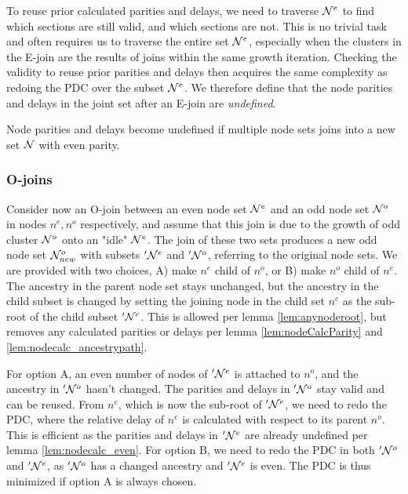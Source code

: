 To reuse prior calculated parities and delays, we need to traverse $\mathcal{N}^e$ to find which sections are still valid, and which sections are not. This is no trivial task and often requires us to traverse the entire set $\mathcal{N}^e$, especially when the clusters in the E-join are the results of joins within the same growth iteration.  Checking the validity to reuse prior parities and delays then acquires the same complexity as redoing the PDC over the subset $\mathcal{N}^e$. We therefore define that the node parities and delays in the joint set after an E-join are \emph{undefined}.

\begin{lemma}\label{lem:nodecalc_even}
  Node parities and delays become undefined if multiple node sets joins into a new set $\mathcal{N}$ with even parity.
\end{lemma}

\subsubsection{O-joins}

Consider now an O-join between an even node set $\mathcal{N}^e$ and an odd node set $\mathcal{N}^o$ in nodes $n^e, n^o$ respectively, and assume that this join is due to the growth of odd cluster $\mathcal{N}^o$ onto an "idle" $\mathcal{N}^e$. The join of these two sets produces a new odd node set $\mathcal{N}_{new}^o$ with subsets $'\mathcal{N}^e$ and $'\mathcal{N}^o$, referring to the original node sets. We are provided with two choices, A) make $n^e$ child of $n^o$, or B) make $n^o$ child of $n^e$. The ancestry in the parent node set stays unchanged, but the ancestry in the child subset is changed by setting the joining node in the child set $n^c$ as the sub-root of the child subset $'\mathcal{N}^c$. This is allowed per lemma \ref{lem:anynoderoot}, but removes any calculated parities or delays per lemma \ref{lem:nodeCalcParity} and \ref{lem:nodecalc_ancestrypath}.

For option A, an even number of nodes of $'\mathcal{N}^e$ is attached to $n^o$, and the ancestry in $'\mathcal{N}^o$ hasn't changed. The parities and delays in $'\mathcal{N}^o$ stay valid and can be reused. From $n^e$, which is now the sub-root of  $'\mathcal{N}^e$, we need to redo the PDC, where the relative delay of $n^e$ is calculated with respect to its parent $n^o$. This is efficient as the parities and delays in $'\mathcal{N}^e$ are already undefined per lemma \ref{lem:nodecalc_even}. For option B, we need to redo the PDC in both $'\mathcal{N}^o$ and $'\mathcal{N}^e$, as $'\mathcal{N}^o$ has a changed ancestry and  $'\mathcal{N}^e$ is even. The PDC is thus minimized if option A is always chosen. \\


